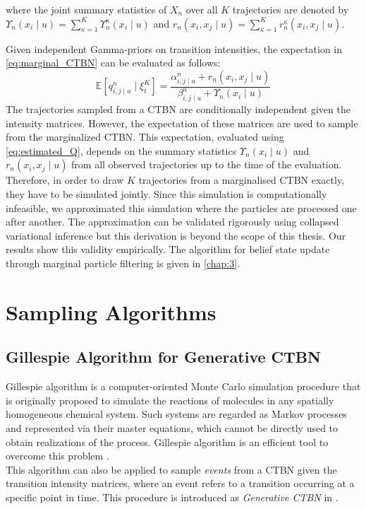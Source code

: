 where the joint summary statistics of $ X_n $ over all $ K $ trajectories are denoted by  $ \Upsilon_{n}(x_i\mid u) = \sum_{\kappa=1}^{K} \Upsilon_{n}^\kappa(x_i\mid u) $ and $ r_{n}(x_i, x_j\mid u) =\sum_{\kappa=1}^{K} r_{n}^\kappa(x_i, x_j\mid u)$.\par
Given independent Gamma-priors on transition intensities, the expectation in \autoref{eq:marginal_CTBN} can be evaluated as follows:
\begin{equation}
\mathbb{E}\left[q_{i,j\mid u}^{n} \mid \xi^K_t\right]=\frac{\alpha^n_{i,j\mid u}+r_{n}(x_i, x_j\mid u)}{\beta^n_{i,j\mid u}+\Upsilon_{n}(x_i \mid u)}
\label{eq:estimated_Q}
\end{equation}
The trajectories sampled from a CTBN are conditionally independent given the intensity matrices. However, the expectation of these matrices are used to sample from the marginalized CTBN. This expectation, evaluated using \autoref{eq:estimated_Q}, depends on the summary statistics $\Upsilon_{n}(x_i\mid u)$ and $ r_{n}(x_i, x_j\mid u)$ from all observed trajectories up to the time of the evaluation. Therefore, in order to draw $K$ trajectories from a marginalised CTBN exactly, they have to be simulated jointly. Since this simulation is computationally infeasible, we approximated this simulation where the particles are processed one after another. The approximation can be validated rigorously using collapsed variational inference but this derivation is beyond the scope of this thesis. Our results show this validity empirically. The algorithm for belief state update through marginal particle filtering is given in \cref{chap:3}. 

\section{Sampling Algorithms}
\label{sec:sampling_alg}
\subsection{Gillespie Algorithm for Generative CTBN}
Gillespie algorithm is a computer-oriented Monte Carlo simulation procedure that is originally proposed to simulate the reactions of molecules in any spatially homogeneous chemical system. Such systems are regarded as Markov processes and represented via their master equations, which cannot be directly used to obtain realizations of the process. Gillespie algorithm is an efficient tool to overcome this problem \cite{Gillespie1976}.\\
This algorithm can also be applied to sample \textit{events} from a CTBN given the transition intensity matrices, where an event refers to a transition occurring at a specific point in time. This procedure is introduced as \textit{Generative CTBN} in \cite{Nodelman1995}.


